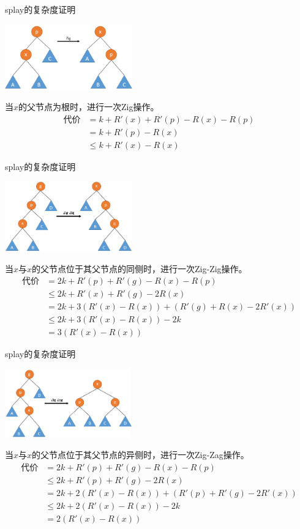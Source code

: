 \documentclass{beamer}
\begin{document}
\begin{frame}{splay的复杂度证明}
\begin{center}
\includegraphics[width=5.5cm]{zig.jpg}
\end{center}

当$x$的父节点为根时，进行一次Zig操作。\pause
$$
\begin{aligned}
\mbox{代价}&=k+R'(x)+R'(p)-R(x)-R(p)\\
&=k+R'(p)-R(x)\\
&\le k + R'(x)-R(x)
\end{aligned}
$$
\end{frame}
\begin{frame}{splay的复杂度证明}
\begin{center}
\includegraphics[width=5.5cm]{zigzig.jpg}
\end{center}

当$x$与$x$的父节点位于其父节点的同侧时，进行一次Zig-Zig操作。\pause
$$
\begin{aligned}
\mbox{代价}&=2k+R'(p)+R'(g)-R(x)-R(p)\\
&\le 2k + R'(x)+R'(g)-2R(x)\\
&=2k + 3(R'(x)-R(x)) + (R'(g)+R(x)-2R'(x))\\
&\le 2k + 3(R'(x)-R(x)) -2k\\
&=3(R'(x)-R(x))
\end{aligned}
$$
\end{frame}
\begin{frame}{splay的复杂度证明}
\begin{center}
\includegraphics[width=5.5cm]{zigzag.jpg}
\end{center}

当$x$与$x$的父节点位于其父节点的异侧时，进行一次Zig-Zag操作。\pause
$$
\begin{aligned}
\mbox{代价}&=2k+R'(p)+R'(g)-R(x)-R(p)\\
&\le 2k+R'(p)+R'(g)-2R(x)\\
&=2k+2(R'(x)-R(x))+(R'(p)+R'(g)-2R'(x))\\
&\le 2k+2(R'(x)-R(x))-2k\\
&=2(R'(x)-R(x))
\end{aligned}
$$
\end{frame}
\end{document}
